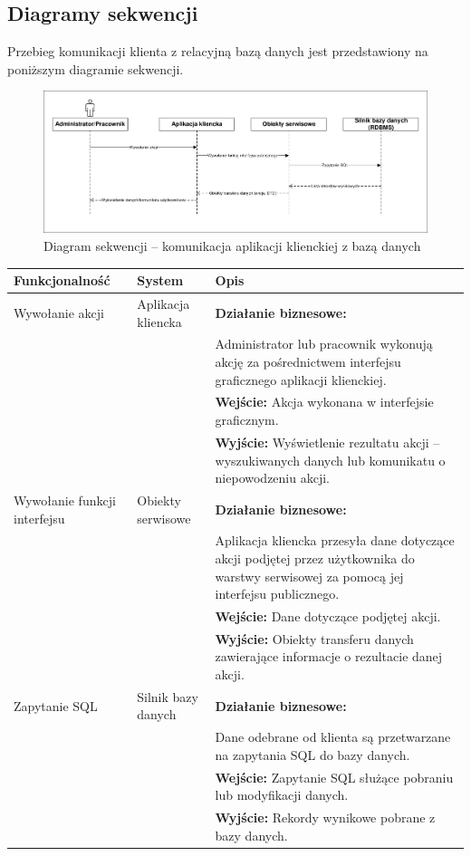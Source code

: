 \documentclass[10pt,a4paper]{article}
\begin{document}
\subsection{Diagramy sekwencji}
Przebieg komunikacji klienta z relacyjną bazą danych jest przedstawiony na poniższym diagramie sekwencji.
\begin{figure}[H]
	\includegraphics[width=16cm]{sequence.pdf}
	\caption{Diagram sekwencji -- komunikacja aplikacji klienckiej z bazą danych}
\end{figure}
\begin{table}[H]
	\begin{tabularx}{\textwidth}{|l|l|X|}
		\hline
		\textbf{Funkcjonalność} & \textbf{System} & \textbf{Opis} \\
		\hline
		Wywołanie akcji &
		Aplikacja kliencka &
		\textbf{Działanie biznesowe:} \\
		& & Administrator lub pracownik wykonują akcję za pośrednictwem interfejsu graficznego aplikacji klienckiej. \\
		& & \textbf{Wejście:} Akcja wykonana w interfejsie graficznym. \\
		& & \textbf{Wyjście:} Wyświetlenie rezultatu akcji -- wyszukiwanych danych lub komunikatu o niepowodzeniu akcji. \\
		\hline
		Wywołanie funkcji interfejsu &
		Obiekty serwisowe &
		\textbf{Działanie biznesowe:} \\
		& & Aplikacja kliencka przesyła dane dotyczące akcji podjętej przez użytkownika do warstwy serwisowej za pomocą jej interfejsu publicznego. \\
		& & \textbf{Wejście:} Dane dotyczące podjętej akcji. \\
		& & \textbf{Wyjście:} Obiekty transferu danych zawierające informacje o rezultacie danej akcji. \\
		\hline
		Zapytanie SQL &
		Silnik bazy danych &
		\textbf{Działanie biznesowe:} \\
		& & Dane odebrane od klienta są przetwarzane na zapytania SQL do bazy danych. \\
		& & \textbf{Wejście:} Zapytanie SQL służące pobraniu lub modyfikacji danych. \\
		& & \textbf{Wyjście:} Rekordy wynikowe pobrane z bazy danych. \\
		\hline
	\end{tabularx}
\end{table}
\end{document}

